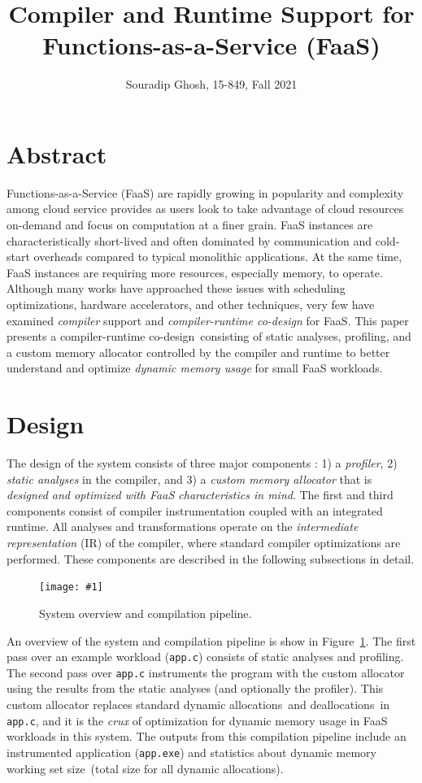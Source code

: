 \documentclass{article}
\title{Compiler and Runtime Support for Functions-as-a-Service (FaaS)}
\date{}
\author{Souradip Ghosh, 15-849, Fall 2021}
\def\pagefig#1{\texttt{[image: \#1]}}
\def\crcd{compiler-runtime co-design}
\def\ALLS{allocations}
\def\DALLS{deallocations}
\def\DWS{dynamic memory working set size}
\begin{document}
\maketitle

\section{Abstract}
Functions-as-a-Service (FaaS) are rapidly growing in popularity and 
complexity among cloud service provides as users look to take 
advantage of cloud resources on-demand and focus on computation
at a finer grain. FaaS instances are characteristically short-lived
and often dominated by communication and cold-start overheads compared
to typical monolithic applications. At the same time, FaaS instances
are requiring more resources, especially memory, to operate. Although
many works have approached these issues with scheduling optimizations,
hardware accelerators, and other techniques, very few have examined
\textit{compiler} support and \textit{\crcd} for FaaS. This paper presents 
a \crcd\ consisting of static analyses, profiling, and a custom memory 
allocator controlled by the compiler and runtime to better understand 
and optimize \textit{dynamic memory usage} for small FaaS workloads.

\section{Design}
The design of the system consists of three major components : 1) a \textit{profiler},
2) \textit{static analyses} in the compiler, and 3) a \textit{custom memory allocator}
that is \textit{designed and optimized with FaaS characteristics in mind}. The first and third components consist 
of compiler instrumentation coupled with an integrated runtime. All analyses and 
transformations operate on the \textit{intermediate representation} (IR) of the compiler, 
where standard compiler optimizations are performed. These components are described in 
the following subsections in detail. 

\begin{figure}[htp]
    \centerline{\pagefig{figs/sys.pdf}}
    \caption{System overview and compilation pipeline. }  
	\label{fig:sys}
\end{figure}

An overview of the system and compilation pipeline is show in Figure~\ref{fig:sys}. The 
first pass over an example workload (\texttt{app.c}) consists of static analyses and 
profiling. The second pass over \texttt{app.c} instruments the program with the custom
allocator using the results from the static analyses (and optionally the profiler). This 
custom allocator replaces standard dynamic \ALLS\ and \DALLS\ in \texttt{app.c}, and it is
the \textit{crux} of optimization for dynamic memory usage in FaaS workloads in this system. The
outputs from this compilation pipeline include an instrumented application (\texttt{app.exe})
and statistics about \DWS\ (total size for all dynamic \ALLS).
\end{document}
